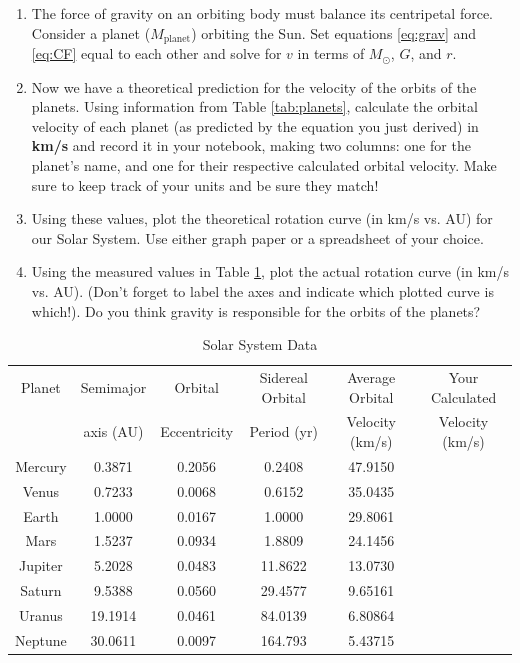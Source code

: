 \documentclass[11pt]{article}%
\begin{document}
\begin{enumerate}
    \item The force of gravity on an orbiting body must balance its centripetal force. Consider a planet ($M_{\textrm{planet}}$) orbiting the Sun. Set equations \ref{eq:grav} and \ref{eq:CF} equal to each other and solve for $v$ in terms of $M_{\odot}$, $G$, and $r$.
    \item Now we have a theoretical prediction for the velocity of the orbits of the planets. Using information from Table \ref{tab:planets}, calculate the orbital velocity of each planet (as predicted by the equation you just derived) in \textbf{km/s} and record it in your notebook, making two columns: one for the planet's name, and one for their respective calculated orbital velocity. Make sure to keep track of your units and be sure they match!
    \item Using these values, plot the theoretical rotation curve (in km/s vs. AU) for our Solar System. Use either graph paper or a spreadsheet of your choice.
    \item Using the measured values in Table \ref{tab:Solar_system}, plot the actual rotation curve (in km/s vs. AU). (Don't forget to label the axes and indicate which plotted curve is which!). Do you think gravity is responsible for the orbits of the planets?
\end{enumerate}

\begin{table}[h!]
    \centering
    \begin{tabular}{cccccc}
        \hline
        \hline
         Planet & Semimajor & Orbital & Sidereal Orbital & Average Orbital & Your Calculated \\
          &  axis (AU) & Eccentricity & Period (yr) & Velocity (km/s) & Velocity (km/s) \\
        \hline
        Mercury & 0.3871 & 0.2056 & 0.2408 & 47.9150 & \\
        Venus   & 0.7233 & 0.0068 & 0.6152 & 35.0435 & \\
        Earth   & 1.0000 & 0.0167 & 1.0000 & 29.8061 & \\
        Mars    & 1.5237 & 0.0934 & 1.8809 & 24.1456 & \\
        Jupiter & 5.2028 & 0.0483 & 11.8622 & 13.0730 & \\
        Saturn  & 9.5388 & 0.0560 & 29.4577 & 9.65161 & \\
        Uranus  & 19.1914 & 0.0461 & 84.0139 & 6.80864 & \\
        Neptune & 30.0611 & 0.0097 & 164.793 & 5.43715 & \\
    \end{tabular}
    \caption{Solar System Data}
    \label{tab:Solar_system}
\end{table}
\end{document}

